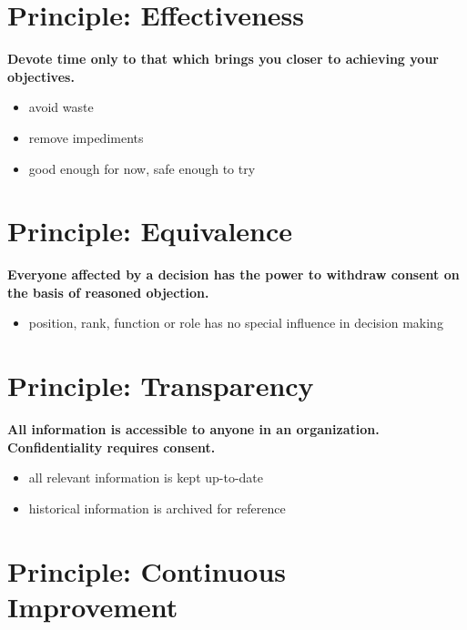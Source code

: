 \section{Principle: Effectiveness}
\label{principle:effectiveness}

\textbf{Devote time only to that which brings you closer to achieving your objectives.}

\begin{itemize}
\item avoid waste

\item remove impediments

\item good enough for now, safe enough to try

\end{itemize}

\section{Principle: Equivalence}
\label{principle:equivalence}

\textbf{Everyone affected by a decision has the power to withdraw consent on the basis of reasoned objection.}

\begin{itemize}
\item position, rank, function or role has no special influence in decision making

\end{itemize}

\section{Principle: Transparency}
\label{principle:transparency}

\textbf{All information is accessible to anyone in an organization. Confidentiality requires consent.}

\begin{itemize}
\item all relevant information is kept up-to-date

\item historical information is archived for reference

\end{itemize}

\section{Principle: Continuous Improvement}
\label{principle:continuousimprovement}


